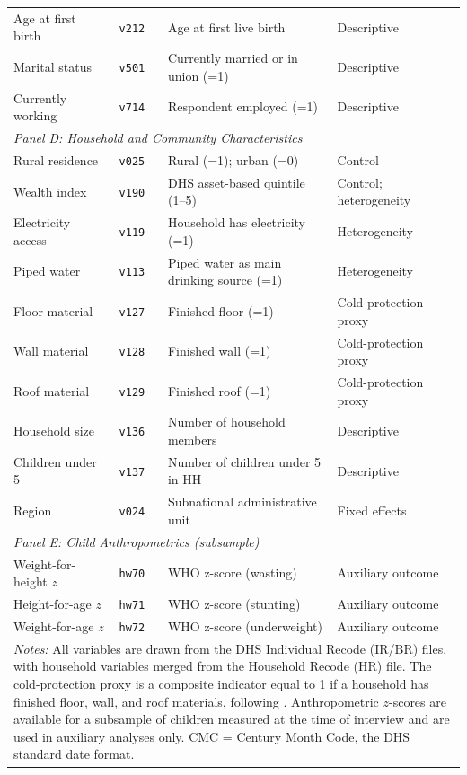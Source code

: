 \begin{table}[htbp]
\begin{tabular}{llll}
Age at first birth    & \texttt{v212} & Age at first live birth             & Descriptive \\
Marital status        & \texttt{v501} & Currently married or in union (=1)  & Descriptive \\
Currently working     & \texttt{v714} & Respondent employed (=1)            & Descriptive \\
[6pt]
\multicolumn{4}{l}{\textit{Panel D: Household and Community Characteristics}} \\[4pt]
Rural residence       & \texttt{v025} & Rural (=1); urban (=0)              & Control \\
Wealth index          & \texttt{v190} & DHS asset-based quintile (1--5)     & Control; heterogeneity \\
Electricity access    & \texttt{v119} & Household has electricity (=1)      & Heterogeneity \\
Piped water           & \texttt{v113} & Piped water as main drinking source (=1) & Heterogeneity \\
Floor material        & \texttt{v127} & Finished floor (=1)                 & Cold-protection proxy \\
Wall material         & \texttt{v128} & Finished wall (=1)                  & Cold-protection proxy \\
Roof material         & \texttt{v129} & Finished roof (=1)                  & Cold-protection proxy \\
Household size        & \texttt{v136} & Number of household members         & Descriptive \\
Children under 5      & \texttt{v137} & Number of children under 5 in HH   & Descriptive \\
Region                & \texttt{v024} & Subnational administrative unit     & Fixed effects \\
[6pt]
\multicolumn{4}{l}{\textit{Panel E: Child Anthropometrics (subsample)}} \\[4pt]
Weight-for-height $z$ & \texttt{hw70} & WHO z-score (wasting)               & Auxiliary outcome \\
Height-for-age $z$    & \texttt{hw71} & WHO z-score (stunting)              & Auxiliary outcome \\
Weight-for-age $z$    & \texttt{hw72} & WHO z-score (underweight)           & Auxiliary outcome \\
\hline\hline
\multicolumn{4}{p{13cm}}{\footnotesize \textit{Notes:} All variables are drawn from the DHS Individual Recode 
(IR/BR) files, with household variables merged from the Household Recode (HR) file. 
The cold-protection proxy is a composite indicator equal to 1 if a household has 
finished floor, wall, and roof materials, following \textcite{wang2025}. 
Anthropometric $z$-scores are available for a subsample of children measured at the 
time of interview and are used in auxiliary analyses only. CMC = Century Month Code, 
the DHS standard date format.} \\
\hline
\end{tabular}
\end{table}
 